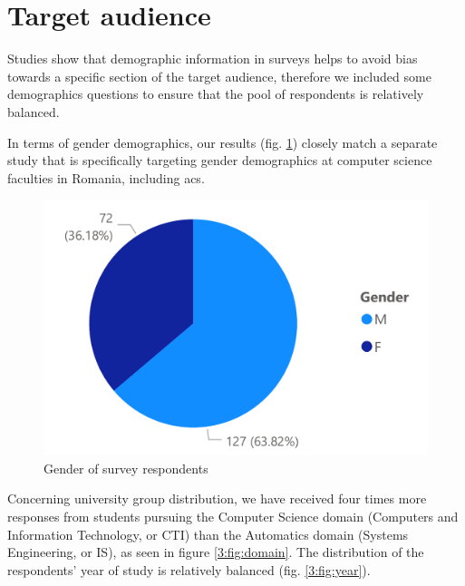 \section{Target audience} \label{3:target_audience}

Studies\cite{hammer2011importance}\cite{connelly2013demographic} show that demographic information in surveys helps to avoid bias towards a specific section of the target audience, therefore we included some demographics questions to ensure that the pool of respondents is relatively balanced.

In terms of gender demographics, our results (fig. \ref{3:fig:gender}) closely match a separate study\cite{codette2019stats} that is specifically targeting gender demographics at computer science faculties in Romania, including \acrshort{acs}.

\begin{figure}[ht]
    \centering
         \includegraphics[height=0.2\textheight]{figures/charts/survey/gender.pdf}
    \caption{Gender of survey respondents}
    \label{3:fig:gender}
\end{figure}

Concerning university group distribution, we have received  four times more responses from students pursuing the Computer Science domain (Computers and Information Technology, or CTI) than the Automatics domain (Systems Engineering, or IS), as seen in figure \ref{3:fig:domain}. The distribution of the respondents' year of study is relatively balanced (fig. \ref{3:fig:year}).

